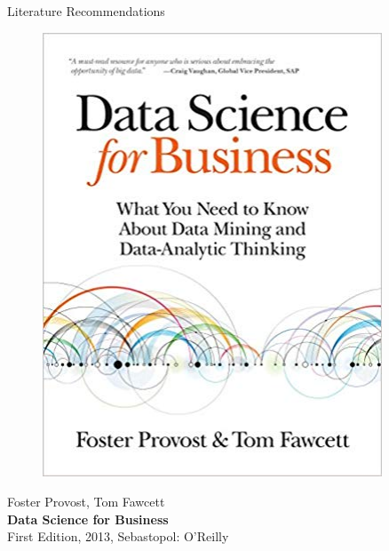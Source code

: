 \documentclass[document.tex]{subfiles}
\begin{document}
    \begin{frame}{Literature Recommendations}
        \begin{minipage}{0.1\textwidth}
            \begin{figure}[H]
                \includegraphics[height=0.2\textheight, width=0.9\textwidth, left]{assets/book-covers/provost2013.jpg}
            \end{figure}
        \end{minipage}
        \begin{minipage}{0.32\textwidth}
            \footnotesize Foster Provost, Tom Fawcett \normalsize \\[-0.5mm]
            \small \textbf{Data Science for Business} \normalsize \\
            \tiny First Edition, 2013, Sebastopol: O'Reilly \normalsize
        \end{minipage}
        \begin{minipage}{0.1\textwidth}
            \begin{figure}[H]

\end{figure}
\end{minipage}
\end{frame}
\end{document}
